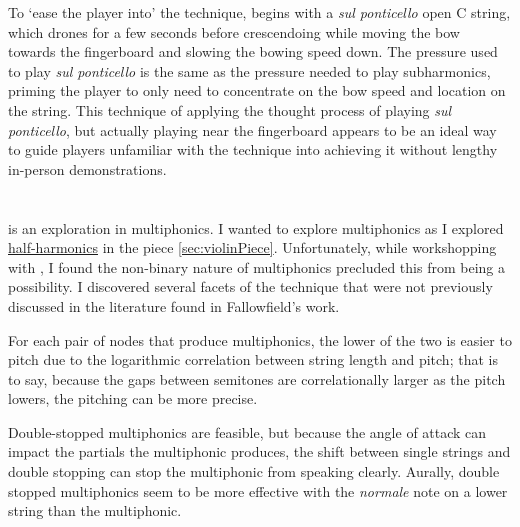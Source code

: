 To `ease the player into' the technique, \violaPiece \space begins with a \emph{sul ponticello} open C string, which drones for a few seconds before crescendoing while moving the bow towards the fingerboard and slowing the bowing speed down.
The pressure used to play \emph{sul ponticello} is the same as the pressure needed to play subharmonics, priming the player to only need to concentrate on the bow speed and location on the string.
This technique of applying the thought process of playing \emph{sul ponticello}, but actually playing near the fingerboard appears to be an ideal way to guide players unfamiliar with the technique into achieving it without lengthy in-person demonstrations.\autocite[]{appleseedFeedbackSightreadingSession2019}

\section{\celloPiece} \label{sec:celloPiece}

\celloPiece \space is an exploration in multiphonics. 
I wanted to explore multiphonics as I explored \hyperref[sec:half-harmonics]{half-harmonics} in the piece \autoref{sec:violinPiece}.
Unfortunately, while workshopping with \celloParticipant, I found the non-binary nature of multiphonics precluded this from being a possibility.\autocite[]{smithFeedbackCelloSightreading2019}
I discovered several facets of the technique that were not previously discussed in the literature found in Fallowfield's work.\autocite[]{fallowfieldCelloMap}

For each pair of nodes that produce multiphonics, the lower of the two is easier to pitch due to the logarithmic correlation between string length and pitch;
that is to say, because the gaps between semitones are correlationally larger as the pitch lowers, the pitching can be more precise.

Double-stopped multiphonics are feasible, but because the angle of attack can impact the partials the multiphonic produces, the shift between single strings and double stopping can stop the multiphonic from speaking clearly.
Aurally, double stopped multiphonics seem to be more effective with the \emph{normale} note on a lower string than the multiphonic.



